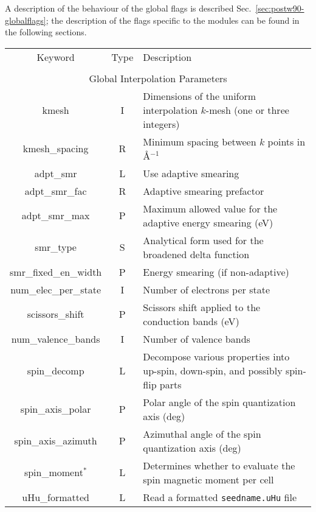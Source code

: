 A description of the behaviour of the global flags is described
Sec.~\ref{sec:postw90-globalflags}; the description of the flags
specific to the modules can be found
in the following sections.

\clearpage

\begin{table}[hH!]
\begin{center}
\begin{tabular}{|c|c|p{6cm}|}
  \hline
  Keyword & Type & Description \\
  &      &             \\
  \hline\hline
  \multicolumn{3}{|c|}{Global Interpolation Parameters} \\
  \hline
  {\sc kmesh}   & I & Dimensions of the uniform interpolation $k$-mesh 
(one or three integers) \\
  {\sc kmesh\_spacing}& R & Minimum spacing between $k$ points in
  \AA$^{-1}$\\
  {\sc adpt\_smr}   & L & Use adaptive smearing\\
  {\sc adpt\_smr\_fac}   & R & Adaptive smearing prefactor\\
  {\sc adpt\_smr\_max} & P & Maximum allowed value for the adaptive
  energy smearing (eV) \\  
  {\sc smr\_type}   & S &  Analytical form used for the broadened delta function\\
  {\sc smr\_fixed\_en\_width}   & P & Energy smearing (if non-adaptive)\\
  {\sc num\_elec\_per\_state}   & I & Number of electrons per state \\
  {\sc scissors\_shift}   & P & Scissors shift applied to the conduction bands (eV) \\
  {\sc num\_valence\_bands}   & I & Number of valence bands \\
  {\sc spin\_decomp}& L & Decompose various properties into
  up-spin, down-spin, and possibly spin-flip parts\\
  {\sc spin\_axis\_polar}& P & Polar angle of the spin quantization axis (deg)\\
  {\sc spin\_axis\_azimuth}& P & Azimuthal angle of the spin quantization axis (deg)\\
  {\sc spin\_moment}$^*$& L & Determines whether to evaluate the spin 
magnetic moment per cell\\ 
  {\sc uHu\_formatted}& L & Read a formatted {\tt seedname.uHu} file \\

\end{tabular}
\end{center}
\end{table}
